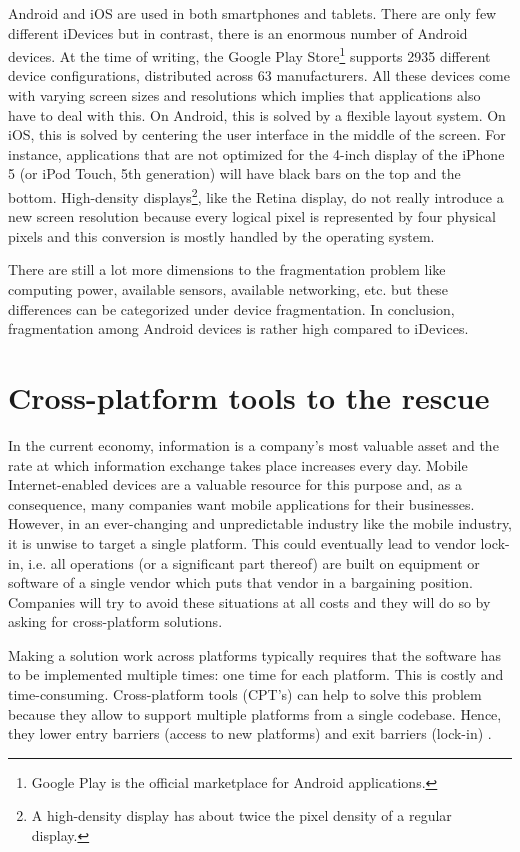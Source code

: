 Android and iOS are used in both smartphones and tablets. There are only few different iDevices  but in contrast, there is an enormous number of Android devices. At the time of writing, the Google Play Store\footnote{Google Play is the official marketplace for Android applications.} supports 2935 different device configurations, distributed across 63 manufacturers. All these devices come  with varying screen sizes and resolutions which implies that applications also have to deal with this. On Android, this is solved by a flexible layout system. On iOS, this is solved by centering the user interface in the middle of the screen. For instance, applications that are not optimized for the 4-inch display of the iPhone 5 (or iPod Touch, 5th generation) will have black bars on the top and the bottom. High-density displays\footnote{A high-density display has about twice the pixel density of a regular display.}, like the Retina display, do not really introduce a new screen resolution because every logical pixel is represented by four physical pixels and this conversion is mostly handled by the operating system.

There are still a lot more dimensions to the fragmentation problem like computing power, available sensors, available networking, etc. but these differences can be categorized under device fragmentation. In conclusion, fragmentation among Android devices is rather high compared to iDevices.

\section{Cross-platform tools to the rescue}

In the current economy, information is a company's most valuable asset and the rate at which information exchange takes place increases every day. Mobile Internet-enabled devices are a valuable resource for this purpose and, as a consequence, many companies want mobile applications for their businesses. However, in an ever-changing and unpredictable industry like the mobile industry, it is unwise to target a single platform. This could eventually lead to vendor lock-in, i.e. all operations (or a significant part thereof) are built on equipment or software of a single vendor which puts that vendor in a bargaining position. Companies will try to avoid these situations at all costs and they will do so by asking for cross-platform solutions. 

Making a solution work across platforms typically requires that the software has to be implemented multiple times: one time for each platform. This is costly and time-consuming. Cross-platform tools (CPT's) can help to solve this problem because they allow to support multiple platforms from a single codebase. Hence, they lower entry barriers (access to new platforms) and exit barriers (lock-in) \cite{VMCPT:2012}. 


